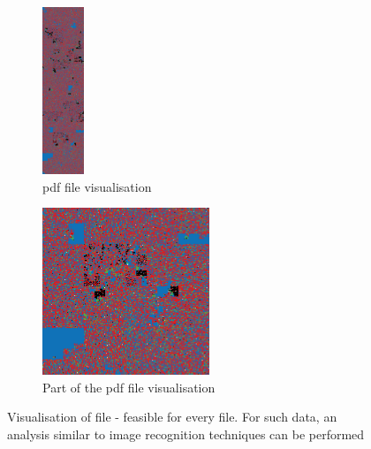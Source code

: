 \begin{figure}[htb]
    \begin{subfigure}{0.45\textwidth}
        \includegraphics[height=5cm]{imgs/crowdstrike2.png}
        \centering
        \caption{\acrshort{pdf} file visualisation}
        \label{fig:subim1}
    \end{subfigure}
    \begin{subfigure}{0.45\textwidth}
        \includegraphics[height=5cm]{imgs/crowdstrike.png}
        \centering
        \caption{Part of the \acrshort{pdf} file visualisation}
        \label{fig:subim2}
    \end{subfigure}
    \centering
    \caption{Visualisation of file - feasible for every file.
    For such data, an analysis similar to image recognition techniques can be performed}
    \label{fig:image2}
\end{figure}
\FloatBarrier

